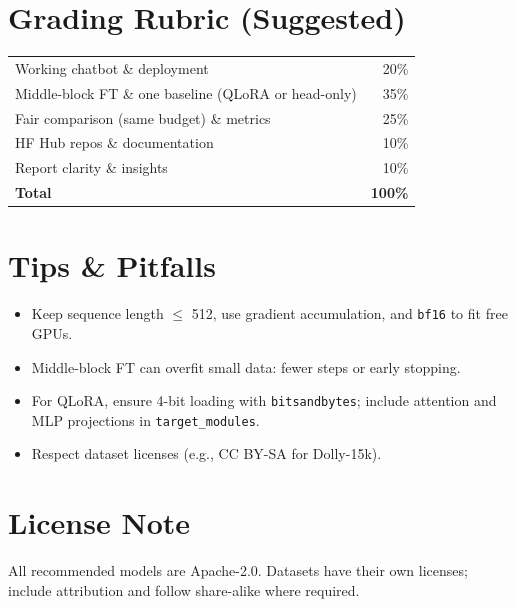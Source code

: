 \documentclass[11pt]{article}
\begin{document}
\section*{Grading Rubric (Suggested)}
\begin{center}
\begin{tabular}{l r}
Working chatbot \& deployment & 20\%\\
Middle-block FT \& one baseline (QLoRA or head-only) & 35\%\\
Fair comparison (same budget) \& metrics & 25\%\\
HF Hub repos \& documentation & 10\%\\
Report clarity \& insights & 10\%\\
\hline
\textbf{Total} & \textbf{100\%}
\end{tabular}
\end{center}

\section*{Tips \& Pitfalls}
\begin{itemize}
  \item Keep sequence length $\leq$ 512, use gradient accumulation, and \texttt{bf16} to fit free GPUs.
  \item Middle-block FT can overfit small data: fewer steps or early stopping.
  \item For QLoRA, ensure 4-bit loading with \texttt{bitsandbytes}; include attention and MLP projections in \texttt{target\_modules}.
  \item Respect dataset licenses (e.g., CC BY-SA for Dolly-15k).
\end{itemize}

\section*{License Note}
All recommended models are Apache-2.0. Datasets have their own licenses; include attribution and follow share-alike where required.
\end{document}
